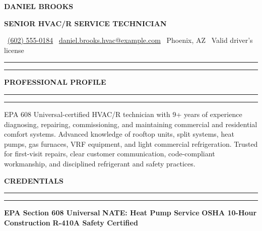 \documentclass[10pt,letterpaper]{article}
\newcommand{\resumesection}[1]{%
  \vspace{4pt}%
  {\large\bfseries\color{navy}\MakeUppercase{#1}}\hspace{7pt}%
  {\color{orange}\rule[3.4pt]{0.28in}{1.5pt}}%
  \vspace{1.5pt}\par
  {\color{rule}\rule{\textwidth}{0.45pt}}%
  \vspace{1.8pt}\par
}
\newcommand{\contactsep}{\hspace{6pt}{\color{orange}\textbullet}\hspace{6pt}}
\begin{document}
\small
\color{ink}

\begin{center}
  {\fontsize{25}{27}\selectfont\bfseries\color{navy} DANIEL BROOKS}\par
  \vspace{1pt}
  {\large\bfseries\color{blue} SENIOR HVAC/R SERVICE TECHNICIAN}\par
  \vspace{4pt}
  {\small
    \faPhone*\ \href{tel:+16025550184}{(602) 555-0184}
    \contactsep
    \faEnvelope\ \href{mailto:daniel.brooks.hvac@example.com}{daniel.brooks.hvac@example.com}
    \contactsep
    \faMapMarker*\ Phoenix, AZ
    \contactsep
    \faTruck\ Valid driver's license
  }
\end{center}

\vspace{2pt}
{\color{navy}\rule{\textwidth}{2.2pt}}
{\color{orange}\rule{0.23\textwidth}{2.2pt}}
\vspace{3pt}

\resumesection{Professional Profile}
EPA 608 Universal-certified HVAC/R technician with 9+ years of experience diagnosing, repairing, commissioning, and maintaining commercial and residential comfort systems. Advanced knowledge of rooftop units, split systems, heat pumps, gas furnaces, VRF equipment, and light commercial refrigeration. Trusted for first-visit repairs, clear customer communication, code-compliant workmanship, and disciplined refrigerant and safety practices.

\resumesection{Credentials}
\colorbox{panel}{%
  \parbox{\dimexpr\textwidth-2\fboxsep\relax}{%
    \vspace{3pt}
    \centering\small
    \textbf{EPA Section 608 Universal}
    \hspace{10pt}{\color{rule}|}\hspace{10pt}
    \textbf{NATE: Heat Pump Service}
    \hspace{10pt}{\color{rule}|}\hspace{10pt}
    \textbf{OSHA 10-Hour Construction}
    \hspace{10pt}{\color{rule}|}\hspace{10pt}
    \textbf{R-410A Safety Certified}
    \vspace{3pt}
  }%
}
\end{document}

